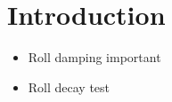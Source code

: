 \section{Introduction}
\label{se:introduction}

\begin{itemize}
    \item Roll damping important
    \item Roll decay test
\end{itemize}
			
